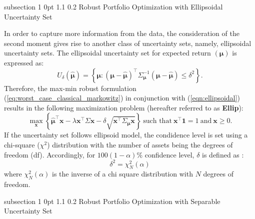 \documentclass[12pt]{article}
\makeatletter
\numberwithin{equation}{section}
\renewcommand{\subsection}{
  \@startsection
  {subsection}%
  {1}%
  {0pt}%
  {1.1\baselineskip}%
  {0.2\baselineskip}%
  {\sc \centering}%
}
\makeatother
\begin{document}
\subsection{Robust Portfolio Optimization with Ellipsoidal Uncertainty Set}

In order to capture more information from the data, the consideration of the second moment gives rise to another class of uncertainty sets, namely, ellipsoidal uncertainty sets. The ellipsoidal uncertainty set for expected return $\left(\boldsymbol{\mu}\right)$ is expressed as:
\begin{equation}
\label{eqn:ellipsoidal}
U_{\delta}(\boldsymbol{\hat{\mu}})=\left\{\boldsymbol{\mu}: (\boldsymbol{\mu}-\boldsymbol{\hat{\mu}})^{\top}\Sigma^{-1}_{\boldsymbol{\mu}}
(\boldsymbol{\mu}-\boldsymbol{\hat{\mu}})\leq\delta^2 \right\}.
\end{equation}
Therefore, the max-min robust formulation (\ref{eq:worst_case_classical_markowitz}) in conjunction with (\ref{eqn:ellipsoidal}) results in the following maximization problem (hereafter referred to as \textbf{Ellip}):
\begin{equation}
\label{eqn:ellipsoidal_markowitz}
\max\limits_{\mathbf{x}}\left\{\boldsymbol{\hat{\mu}}^{\top}\mathbf{x}-\lambda \mathbf{x}^{\top}\Sigma\mathbf{x}
-\delta\sqrt{\mathbf{x}^{\top}\Sigma_{\boldsymbol{\mu}}\mathbf{x}}\right\}~\text{such that}~\mathbf{x^{\top}}\mathbf{1}=1~\text{and}~\mathbf{x}\geq 0.
\end{equation}
If the uncertainty set follows ellipsoid model, the condidence level is set using a chi-square ($\chi^{2}$) distribution with the number of assets being the degrees of freedom (df).
Accordingly, for $100(1-\alpha)\%$ confidence level, $\delta$ is defined as \cite{Ceria06,Scherer07}:
\begin{equation}
\delta^2=\chi_{N}^2(\alpha)
\end{equation}
where $\chi_{N}^2(\alpha)$ is the inverse of a chi square distribution with $N$ degrees of freedom.

\subsection{Robust Portfolio Optimization with Separable Uncertainty Set}
\end{document}

